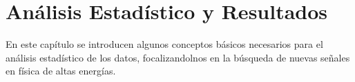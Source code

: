\chapter{An\'alisis Estad\'istico y Resultados}

En este capítulo se introducen algunos conceptos básicos necesarios para el análisis
estadístico de los datos, focalizandolnos en la búsqueda de nuevas se\~nales en física de altas
energías.










